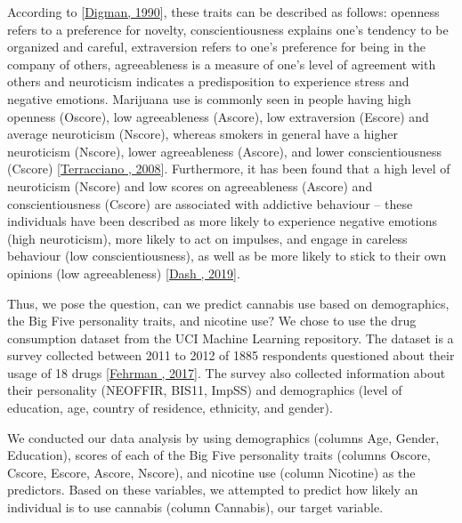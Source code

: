 \documentclass[letterpaper,10pt,english]{jupyterBook}
\begin{document}
\sphinxAtStartPar
According to {[}\hyperlink{cite.Cannabis-Use-Prediction_Analysis:id9}{Digman, 1990}{]}, these traits can be described as follows: openness refers to a preference for novelty, conscientiousness explains one’s tendency to be organized and careful, extraversion refers to one’s preference for being in the company of others, agreeableness is a measure of one’s level of agreement with others and neuroticism indicates a predisposition to experience stress and negative emotions. Marijuana use is commonly seen in people having high openness (Oscore), low agreeableness (Ascore), low extraversion (Escore) and average neuroticism (Nscore), whereas smokers in general have a higher neuroticism (Nscore), lower agreeableness (Ascore), and lower conscientiousness (Cscore) {[}\hyperlink{cite.Cannabis-Use-Prediction_Analysis:id12}{Terracciano , 2008}{]}. Furthermore, it has been found that a high level of neuroticism (Nscore) and low scores on agreeableness (Ascore) and conscientiousness (Cscore) are associated with addictive behaviour – these individuals have been described as more likely to experience negative emotions (high neuroticism), more likely to act on impulses, and engage in careless behaviour (low conscientiousness), as well as be more likely to stick to their own opinions (low agreeableness) {[}\hyperlink{cite.Cannabis-Use-Prediction_Analysis:id8}{Dash , 2019}{]}. 

\sphinxAtStartPar
Thus, we pose the question, can we predict cannabis use based on demographics, the Big Five personality traits, and nicotine use? 
We chose to use the drug consumption dataset from the UCI Machine Learning repository. The dataset is a survey collected between 2011 to 2012 of 1885 respondents questioned about their usage of 18 drugs {[}\hyperlink{cite.Cannabis-Use-Prediction_Analysis:id11}{Fehrman , 2017}{]}. The survey also collected information about their personality (NEO\sphinxhyphen{}FFI\sphinxhyphen{}R, BIS\sphinxhyphen{}11, ImpSS) and demographics (level of education, age, country of residence, ethnicity, and gender).

\begin{DUlineblock}{0em}
\item[] 
\end{DUlineblock}

\sphinxAtStartPar
We conducted our data analysis by using demographics (columns Age, Gender, Education),  scores of each of the Big Five personality traits (columns Oscore, Cscore, Escore, Ascore, Nscore), and nicotine use (column Nicotine) as the predictors. Based on these variables, we attempted to predict how likely an individual is to use cannabis (column Cannabis), our target variable. 
\end{document}
